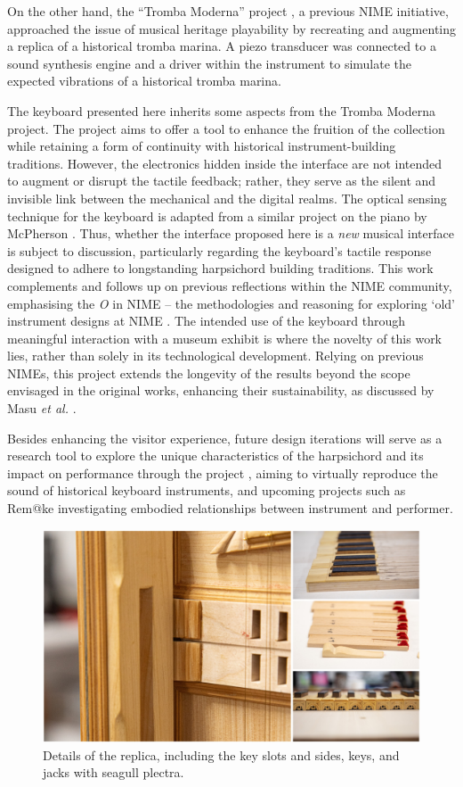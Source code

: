 On the other hand, the ``Tromba Moderna'' project \cite{Baldwin2016}, a previous NIME initiative, approached the issue of musical heritage playability by recreating and augmenting a replica of a historical tromba marina. A piezo transducer was connected to a sound synthesis engine and a driver within the instrument to simulate the expected vibrations of a historical tromba marina. 


The keyboard presented here inherits some aspects from the Tromba Moderna project. The project aims to offer a tool to enhance the fruition of the  collection while retaining a form of continuity with historical instrument-building traditions. However, the electronics hidden inside the interface are not intended to augment or disrupt the tactile feedback; rather, they serve as the silent and invisible link between the mechanical and the digital realms. 
The optical sensing technique for the keyboard is adapted from a similar project on the piano by McPherson \cite{McPherson2013}. 
Thus, whether the interface proposed here is a \emph{new} musical interface is subject to discussion, particularly regarding the keyboard's tactile response designed to adhere to longstanding harpsichord building traditions. This work complements and follows up on previous reflections within the NIME community, emphasising the \emph{O} in NIME -- the methodologies and reasoning for exploring `old' instrument designs at NIME \cite{Masu_NIME_2023}. The intended use of the keyboard through meaningful interaction with a museum exhibit is where the novelty of this work lies, rather than solely in its technological development. Relying on previous NIMEs, this project extends the longevity of the results beyond the scope envisaged in the original works, enhancing their sustainability, as discussed by Masu \emph{et al.} \cite{Masu_NIME_2023}.

Besides enhancing the visitor experience, future design iterations will serve as a research tool to explore the unique characteristics of the harpsichord and its impact on performance through the  project , aiming to virtually reproduce the sound of historical keyboard instruments, and upcoming projects such as Rem@ke \cite{remake1} investigating embodied relationships between instrument and performer.

\begin{figure}
\centering
\includegraphics[width=0.8\linewidth]{src/images/details.jpg}
\caption{Details of the replica, including the key slots and sides, keys, and jacks with seagull plectra.}
\label{fig:details}
\end{figure}

